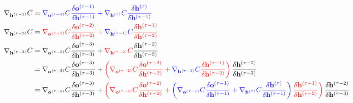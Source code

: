 \documentclass[12pt]{article}
\begin{document}
\begin{align}
    \nabla_{\mathbf{h}^{(\tau-1)}} C &= \color{blue}\nabla_{\mathbf{o}^{(\tau-1)}}C \frac{\delta \mathbf{o}^{(\tau-1)}}{\delta \mathbf{h}^{(\tau-1)}} + \nabla_{\mathbf{h}^{(\tau)}}C \frac{\delta \mathbf{h}^{(\tau)}}{\delta \mathbf{h}^{(\tau-1)}} \\
    \nabla_{\mathbf{h}^{(\tau-2)}} C &= \color{red}\nabla_{\mathbf{o}^{(\tau-2)}}C \frac{\delta \mathbf{o}^{(\tau-2)}}{\delta \mathbf{h}^{(\tau-2)}} + \color{blue}\nabla_{\mathbf{h}^{(\tau-1)}}C \color{red} \frac{\delta \mathbf{h}^{(\tau-1)}}{\delta \mathbf{h}^{(\tau-2)}} \\
    \nabla_{\mathbf{h}^{(\tau-3)}} C &= \nabla_{\mathbf{o}^{(\tau-3)}}C \frac{\delta \mathbf{o}^{(\tau-3)}}{\delta \mathbf{h}^{(\tau-3)}} + \color{red}\nabla_{\mathbf{h}^{(\tau-2)}}C \color{black} \frac{\delta \mathbf{h}^{(\tau-2)}}{\delta \mathbf{h}^{(\tau-3)}} \\
    &= \nabla_{\mathbf{o}^{(\tau-3)}}C \frac{\delta \mathbf{o}^{(\tau-3)}}{\delta \mathbf{h}^{(\tau-3)}} + \color{red}\left(\nabla_{\mathbf{o}^{(\tau-2)}}C \frac{\delta \mathbf{o}^{(\tau-2)}}{\delta \mathbf{h}^{(\tau-2)}} + \color{blue}\nabla_{\mathbf{h}^{(\tau-1)}}C\color{red} \frac{\delta \mathbf{h}^{(\tau-1)}}{\delta \mathbf{h}^{(\tau-2)}} \right) \color{black} \frac{\delta \mathbf{h}^{(\tau-2)}}{\delta \mathbf{h}^{(\tau-3)}} \\
    &= \nabla_{\mathbf{o}^{(\tau-3)}}C \frac{\delta \mathbf{o}^{(\tau-3)}}{\delta \mathbf{h}^{(\tau-3)}} + \color{red}\left(\nabla_{\mathbf{o}^{(\tau-2)}}C \frac{\delta \mathbf{o}^{(\tau-2)}}{\delta \mathbf{h}^{(\tau-2)}} + \color{blue}\left(\color{blue}\nabla_{\mathbf{o}^{(\tau-1)}}C \frac{\delta \mathbf{o}^{(\tau-1)}}{\delta \mathbf{h}^{(\tau-1)}} + \nabla_{\mathbf{h}^{(\tau)}}C \frac{\delta \mathbf{h}^{(\tau)}}{\delta \mathbf{h}^{(\tau-1)}} \right)\color{red} \frac{\delta \mathbf{h}^{(\tau-1)}}{\delta \mathbf{h}^{(\tau-2)}} \right) \color{black} \frac{\delta \mathbf{h}^{(\tau-2)}}{\delta \mathbf{h}^{(\tau-3)}} \\
\end{align}
\end{document}
